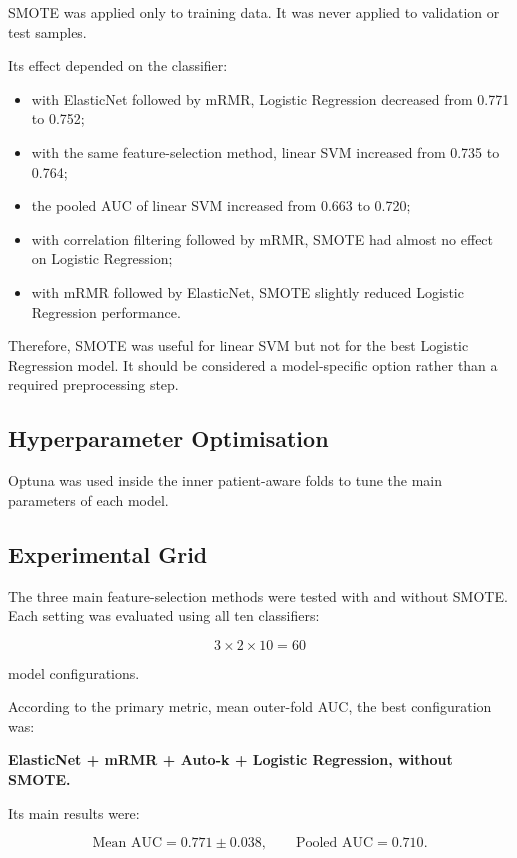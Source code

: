 \documentclass[10pt,a4paper]{article}
\begin{document}
SMOTE was applied only to training data. It was never applied to validation or test samples.

Its effect depended on the classifier:

\begin{itemize}[leftmargin=1.5em]
    \item with ElasticNet followed by mRMR, Logistic Regression decreased from 0.771 to 0.752;
    \item with the same feature-selection method, linear SVM increased from 0.735 to 0.764;
    \item the pooled AUC of linear SVM increased from 0.663 to 0.720;
    \item with correlation filtering followed by mRMR, SMOTE had almost no effect on Logistic Regression;
    \item with mRMR followed by ElasticNet, SMOTE slightly reduced Logistic Regression performance.
\end{itemize}

Therefore, SMOTE was useful for linear SVM but not for the best Logistic Regression model. It should be considered a model-specific option rather than a required preprocessing step.

\subsection{Hyperparameter Optimisation}

Optuna was used inside the inner patient-aware folds to tune the main parameters of each model.

\subsection{Experimental Grid}

The three main feature-selection methods were tested with and without SMOTE. Each setting was evaluated using all ten classifiers:

\[
3 \times 2 \times 10 = 60
\]

model configurations.

According to the primary metric, mean outer-fold AUC, the best configuration was:

\begin{center}
\textbf{ElasticNet + mRMR + Auto-k
+ Logistic Regression, without SMOTE.}
\end{center}

Its main results were:

\[
\text{Mean AUC} = 0.771 \pm 0.038,
\qquad
\text{Pooled AUC} = 0.710.
\]
\end{document}
